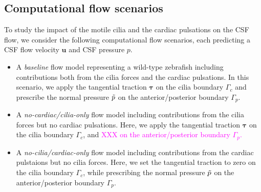 \documentclass[fleqn]{wlscirep}
\newcommand{\Gc}{\Gamma_{c}}
\newcommand{\Gp}{\Gamma_{p}}
\newcommand{\uu}{\mathbf{u}}
\newcommand{\btau}{\bm{\tau}}
\newcommand{\mer}[1]{\textcolor{magenta}{#1}}
\begin{document}
\subsection*{Computational flow scenarios}
To study the impact of the motile cilia and the cardiac pulsations on the CSF flow, we consider the following computational flow scenarios, each predicting a CSF flow velocity $\uu$ and CSF pressure $p$.
\begin{itemize}
    \item A \emph{baseline} flow model representing a wild-type zebrafish including contributions both from the cilia forces and the cardiac pulsations. In this scenario, we apply the tangential traction $\btau$ on the cilia boundary $\Gc$ and prescribe the normal pressure $\Tilde{p}$ on the anterior/posterior boundary $\Gp$. %

    \item A \emph{no-cardiac/cilia-only} flow model including contributions from the cilia forces but no cardiac pulsations. Here, we apply the tangential traction $\btau$ on the cilia boundary $\Gc$, and \mer{XXX on the anterior/posterior boundary $\Gp$.} %

    \item A \emph{no-cilia/cardiac-only} flow model including contributions from the cardiac pulstaions but no cilia forces. Here, we set the tangential traction to zero on the cilia boundary $\Gc$, while prescribing the normal pressure $\Tilde{p}$ on the anterior/posterior boundary $\Gp$.  %

\end{itemize}
\end{document}

